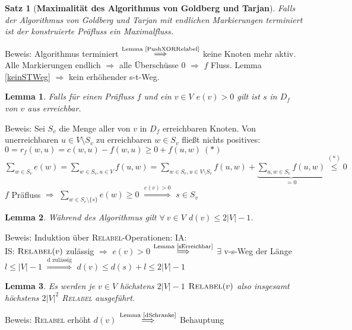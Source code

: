\documentclass[a4paper,10pt]{scrartcl}
\newcommand{\tbf}{\textbf}
\newcommand{\tsc}{\textsc}
\newcommand{\Ra}{\Rightarrow}
\newtheorem{satz}{Satz}
\newtheorem{lemma}{Lemma}
\begin{document}
\begin{satz}[\tbf{Maximalität des Algorithmus von \textsf{Goldberg} und \textsf{Tarjan}}]
 Falls der Algorithmus von \textsf{Goldberg} und \textsf{Tarjan} mit endlichen Markierungen terminiert ist der konstruierte Präfluss ein Maximalfluss.
\end{satz}

Beweis: Algorithmus terminiert $\overset{\text{Lemma \ref{PushXORRelabel}}}{\Longrightarrow}$ keine Knoten mehr aktiv. Alle Markierungen endlich $\Ra$ alle Überschüsse $0$ $\Ra$ $f$ Fluss. Lemma \ref{keinSTWeg} $\Ra$ kein erhöhender s-t-Weg. \\

\begin{lemma}\label{sErreichbar}
 Falls für einen Präfluss $f$ und ein $v \in V$ $e(v) > 0$ gilt ist $s$ in $D_f$ von $v$ aus erreichbar.
\end{lemma}

Beweis: Sei $S_v$ die Menge aller von $v$ in $D_f$ erreichbaren Knoten. Von unerreichbaren $u \in V \setminus S_v$ zu erreichbaren $w \in S_v$ fließt nichts positives: $0 = r_f(w,u) = c(w,u) - f(w,u) \geq 0 + f(u,w) \ (*)$\\
$\sum_{w \in S_v} \limits e(w) = \sum_{w \in S_v, u \in V} \limits f(u,w) = \sum_{w \in S_v, u \in V \setminus S_v} \limits f(u,w) + \underbrace{\sum_{u,w \in S_v} \limits f(u,w)}_{= 0} \overset{(*)}{\leq} 0$ \\
$f$ Präfluss $\Ra$ $\sum_{w \in S_v \setminus \{s\}} \limits e(w) \geq 0$ $\overset{e(v) > 0}{\Longrightarrow}$ $s \in S_v$

\begin{lemma}\label{dSchranke}
 Während des Algorithmus gilt $\forall \ v \in V$ $d(v) \leq 2|V| - 1$.
\end{lemma}

Beweis: Induktion über \tsc{Relabel}-Operationen: IA: \checkmark \\ IS: $\tsc{Relabel}(v)$ zulässig $\Ra$ $e(v) > 0$ $\overset{\text{Lemma \ref{sErreichbar}}}{\Longrightarrow}$ $\exists$ v-s-Weg der Länge $l \leq |V| - 1$ $\overset{\text{d zulässig}}{\Longrightarrow}$ $d(v) \leq d(s) + l \leq 2|V| - 1$

\begin{lemma}\label{RelabelSchranke}
 Es werden je $v \in V$ höchstens $2|V| - 1$ $\tsc{Relabel}(v)$ also insgesamt höchstens $2|V|^2$ \tsc{Relabel} ausgeführt.
\end{lemma}

Beweis: \tsc{Relabel} erhöht $d(v)$ $\overset{\text{Lemma \ref{dSchranke}}}{\Longrightarrow}$ Behauptung \\
\end{document}
